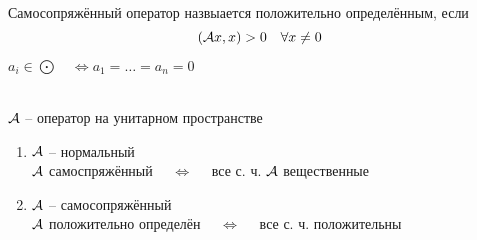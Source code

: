 \begin{definition}
	Самосопряжённый оператор назвыается положительно определённым, если
	$$ (\mathcal{A}x, x) > 0 \quad \forall x \ne 0 $$
\end{definition}

\begin{notation}
	$ a_i \in \bigodot \quad \iff a_1 = \dots = a_n = 0 $
\end{notation}

\begin{theorem}
	\hfill \\
	$ \mathcal{A} $ -- оператор на унитарном пространстве
	\begin{enumerate}
		\item $ \mathcal{A} $ -- нормальный \\
		$ \mathcal{A} $ самоспряжённый $ \quad \iff \quad $ все с. ч. $ \mathcal{A} $ вещественные

		\item $ \mathcal{A} $ -- самосопряжённый \\
		$ \mathcal{A} $ положительно определён $ \quad \iff \quad $ все с. ч. положительны
	\end{enumerate}
\end{theorem}

